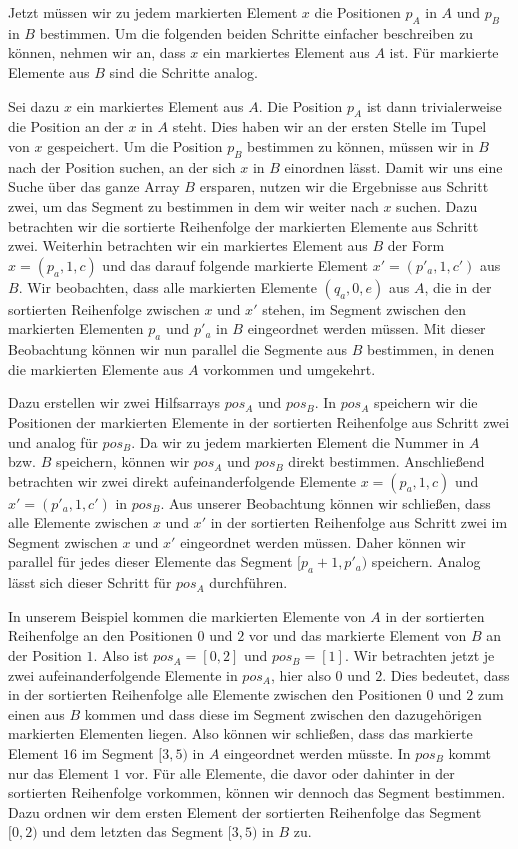 Jetzt müssen wir zu jedem markierten Element $x$ die Positionen $p_A$ in $A$ und $p_B$ in $B$ bestimmen. Um die folgenden beiden Schritte einfacher beschreiben zu können, nehmen wir an, dass $x$ ein markiertes Element aus $A$ ist. Für markierte Elemente aus $B$ sind die Schritte analog. \par
Sei dazu $x$ ein markiertes Element aus $A$. Die Position $p_A$ ist dann trivialerweise die Position an der $x$ in $A$ steht. Dies haben wir an der ersten Stelle im Tupel von $x$ gespeichert. Um die Position $p_B$ bestimmen zu können, müssen wir in $B$ nach der Position suchen, an der sich $x$ in $B$ einordnen lässt. Damit wir uns eine Suche über das ganze Array $B$ ersparen, nutzen wir die Ergebnisse aus Schritt zwei, um das Segment zu bestimmen in dem wir weiter nach $x$ suchen. 
Dazu betrachten wir die sortierte Reihenfolge der markierten Elemente aus Schritt zwei. Weiterhin betrachten wir ein markiertes Element aus $B$ der Form $x = (p_a, 1, c)$ und das darauf folgende markierte Element $x' = (p'_a, 1, c')$ aus $B$. Wir beobachten, dass alle markierten Elemente $(q_a, 0, e)$ aus $A$, die in der sortierten Reihenfolge zwischen $x$ und $x'$ stehen, im Segment zwischen den markierten Elementen $p_a$ und $p'_a$ in $B$ eingeordnet werden müssen. Mit dieser Beobachtung können wir nun parallel die Segmente aus $B$ bestimmen, in denen die markierten Elemente aus $A$ vorkommen und umgekehrt. \par
Dazu erstellen wir zwei Hilfsarrays $pos_A$ und $pos_B$. In $pos_A$ speichern wir die Positionen der markierten Elemente in der sortierten Reihenfolge aus Schritt zwei und analog für $pos_B$. Da wir zu jedem markierten Element die Nummer in $A$ bzw. $B$ speichern, können wir $pos_A$ und $pos_B$ direkt bestimmen. Anschließend betrachten wir zwei direkt aufeinanderfolgende Elemente $x=(p_a, 1, c)$ und $x'=(p'_a, 1, c')$ in $pos_B$. Aus unserer Beobachtung können wir schließen, dass alle Elemente zwischen $x$ und $x'$ in der sortierten Reihenfolge aus Schritt zwei im Segment zwischen $x$ und $x'$ eingeordnet werden müssen. Daher können wir parallel für jedes dieser Elemente das Segment $[p_a+1, p'_a)$ speichern. Analog lässt sich dieser Schritt für $pos_A$ durchführen. \par
In unserem Beispiel kommen die markierten Elemente von $A$ in der sortierten Reihenfolge an den Positionen $0$ und $2$ vor und das markierte Element von $B$ an der Position $1$. Also ist $pos_A = [0,2]$ und $pos_B = [1]$. Wir betrachten jetzt je zwei aufeinanderfolgende Elemente in $pos_A$, hier also $0$ und $2$. Dies bedeutet, dass in der sortierten Reihenfolge alle Elemente zwischen den Positionen $0$ und $2$ zum einen aus $B$ kommen und dass diese im Segment zwischen den dazugehörigen markierten Elementen liegen. Also können wir schließen, dass das markierte Element $16$ im Segment $[3, 5)$ in $A$ eingeordnet werden müsste. In $pos_B$ kommt nur das Element $1$ vor. Für alle Elemente, die davor oder dahinter in der sortierten Reihenfolge vorkommen, können wir dennoch das Segment bestimmen. Dazu ordnen wir dem ersten Element der sortierten Reihenfolge das Segment $[0,2)$ und dem letzten das Segment $[3,5)$ in $B$ zu.

